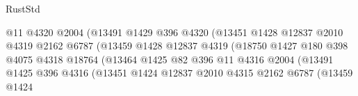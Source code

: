 \begin{lexlean}{RustStd}
\begin{coremodule}
                                            @11
                                            @4320
                                            @2004
                                            (@13491
                                              @1429
                                              @396
                                              @4320
                                              (@13451
                                                @1428
                                                @12837
                                                @2010
                                                @4319
                                                @2162
                                                @6787
                                                (@13459
                                                  @1428
                                                  @12837
                                                  @4319
                                                  (@18750
                                                    @1427
                                                    @180
                                                    @398
                                                    @4075
                                                    @4318
                                                    @18764
                                                    (@13464
                                                      @1425
                                                      @82
                                                      @396
                                                      @11
                                                      @4316
                                                      @2004
                                                      (@13491
                                                        @1425
                                                        @396
                                                        @4316
                                                        (@13451
                                                          @1424
                                                          @12837
                                                          @2010
                                                          @4315
                                                          @2162
                                                          @6787
                                                          (@13459
                                                            @1424

\end{coremodule}
\end{lexlean}
